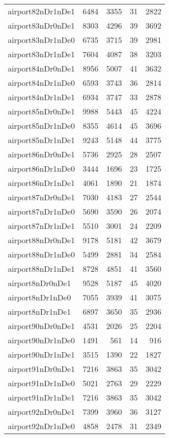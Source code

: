 \begin{longtable}{lrrrr}
airport82nDr1nDe1 & 6484 & 3355 & 31 & 2822 \\
airport83nDr0nDe1 & 8303 & 4296 & 39 & 3692 \\
airport83nDr1nDe0 & 6735 & 3715 & 39 & 2981 \\
airport83nDr1nDe1 & 7604 & 4087 & 38 & 3203 \\
airport84nDr0nDe1 & 8956 & 5007 & 41 & 3632 \\
airport84nDr1nDe0 & 6593 & 3743 & 36 & 2814 \\
airport84nDr1nDe1 & 6934 & 3747 & 33 & 2878 \\
airport85nDr0nDe1 & 9988 & 5443 & 45 & 4224 \\
airport85nDr1nDe0 & 8355 & 4614 & 45 & 3696 \\
airport85nDr1nDe1 & 9243 & 5148 & 44 & 3775 \\
airport86nDr0nDe1 & 5736 & 2925 & 28 & 2507 \\
airport86nDr1nDe0 & 3444 & 1696 & 23 & 1725 \\
airport86nDr1nDe1 & 4061 & 1890 & 21 & 1874 \\
airport87nDr0nDe1 & 7030 & 4183 & 27 & 2544 \\
airport87nDr1nDe0 & 5690 & 3590 & 26 & 2074 \\
airport87nDr1nDe1 & 5510 & 3001 & 24 & 2209 \\
airport88nDr0nDe1 & 9178 & 5181 & 42 & 3679 \\
airport88nDr1nDe0 & 5499 & 2881 & 34 & 2584 \\
airport88nDr1nDe1 & 8728 & 4851 & 41 & 3560 \\
airport8nDr0nDe1 & 9528 & 5187 & 45 & 4020 \\
airport8nDr1nDe0 & 7055 & 3939 & 41 & 3075 \\
airport8nDr1nDe1 & 6897 & 3650 & 35 & 2936 \\
airport90nDr0nDe1 & 4531 & 2026 & 25 & 2204 \\
airport90nDr1nDe0 & 1491 & 561 & 14 & 916 \\
airport90nDr1nDe1 & 3515 & 1390 & 22 & 1827 \\
airport91nDr0nDe1 & 7216 & 3863 & 35 & 3042 \\
airport91nDr1nDe0 & 5021 & 2763 & 29 & 2229 \\
airport91nDr1nDe1 & 7216 & 3863 & 35 & 3042 \\
airport92nDr0nDe1 & 7399 & 3960 & 36 & 3127 \\
airport92nDr1nDe0 & 4858 & 2478 & 31 & 2349 \\

\end{longtable}
